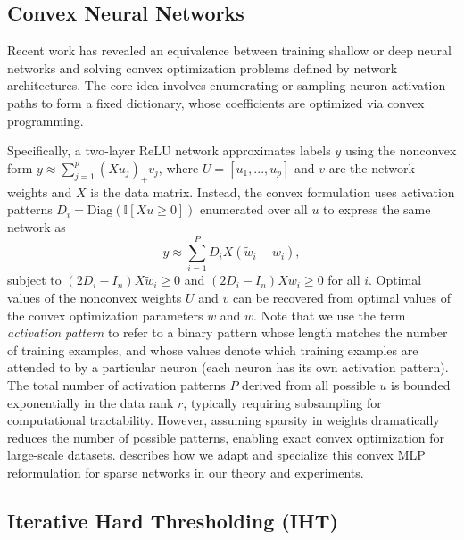 \documentclass{article} %
\newcommand{\1}{\ensuremath{{\sf (i)}}}
\newcommand{\2}{\ensuremath{{\sf (ii)}}}
\newcommand{\3}{\ensuremath{{\sf (iii)}}}
\newcommand{\4}{\ensuremath{{\sf (iv)}}}
\newcommand{\5}{\ensuremath{{\sf (v)}}}
\newcommand{\6}{\ensuremath{{\sf (vi)}}}
\begin{document}
\subsection{Convex Neural Networks}
Recent work has revealed an equivalence between training shallow \citep{convexnn2layer} or deep \citep{deepconvex} neural networks and solving convex optimization problems defined by network architectures. The core idea involves enumerating or sampling neuron activation paths to form a fixed dictionary, whose coefficients are optimized via convex programming. 


Specifically, a two-layer ReLU network approximates labels \( y \) using the nonconvex form \( y \approx \sum_{j=1}^p (Xu_j)_+v_j \), where $U=[u_1,...,u_p]$ and $v$ are the network weights and $X$ is the data matrix. Instead, the convex formulation uses activation patterns \(D_i = \text{Diag}(\mathbb{I}[Xu\ge0])\) enumerated over all $u$ to express the same network as 
\begin{equation}
\label{eq:convNN}
    y \approx \sum_{i=1}^P {D_i X (\tilde w_i - w_i)},
\end{equation}
subject to $(2D_i-I_n)X\tilde w_i \geq 0$ and $(2D_i-I_n)Xw_i \geq 0$ for all $i$. 
Optimal values of the nonconvex weights $U$ and $v$ can be recovered from optimal values of the convex optimization parameters $\tilde w$ and $w$.
Note that we use the term \emph{activation pattern} to refer to a binary pattern whose length matches the number of training examples, and whose values denote which training examples are attended to by a particular neuron (each neuron has its own activation pattern).
The total number of activation patterns \(P\) derived from all possible $u$ is bounded exponentially in the data rank \( r \), typically requiring subsampling for computational tractability. However, assuming sparsity in weights dramatically reduces the number of possible patterns, enabling exact convex optimization for large-scale datasets.  describes how we adapt and specialize this convex MLP reformulation for sparse networks in our theory and experiments.


\subsection{Iterative Hard Thresholding (IHT)}
\end{document}
